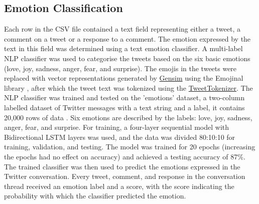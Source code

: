 \documentclass[acmtog]{acmart}
\begin{document}
\subsection{Emotion Classification}
Each row in the CSV file contained a text field representing either a tweet, a comment on a tweet or a response to a comment. The emotion expressed by the text in this field was determined using a text emotion classifier. A multi-label NLP classifier was used to categorise the tweets based on the six basic emotions (love, joy, sadness, anger, fear, and surprise). The emojis in the tweets were replaced with vector representations generated by \href{https://radimrehurek.com/gensim/}{Gensim} using the Emojinal library \cite{barry2021emojional}, after which the tweet text was tokenized using the \href{https://www.nltk.org/api/nltk.tokenize.casual.html}{TweetTokenizer}. The NLP classifier was trained and tested on the 'emotions' dataset, a two-column labelled dataset of Twitter messages with a text string and a label, it contains 20,000 rows of data \cite{saravia-etal-2018-carer}. Six emotions are described by the labels: love, joy, sadness, anger, fear, and surprise. For training, a four-layer sequential model with Bidirectional LSTM layers was used, and the data was divided 80:10:10 for training, validation, and testing. The model was trained for 20 epochs (increasing the epochs had no effect on accuracy) and achieved a testing accuracy of 87\%. The trained classifier was then used to predict the emotions expressed in the Twitter conversation. Every tweet, comment, and response in the conversation thread received an emotion label and a score, with the score indicating the probability with which the classifier predicted the emotion.
\end{document}
